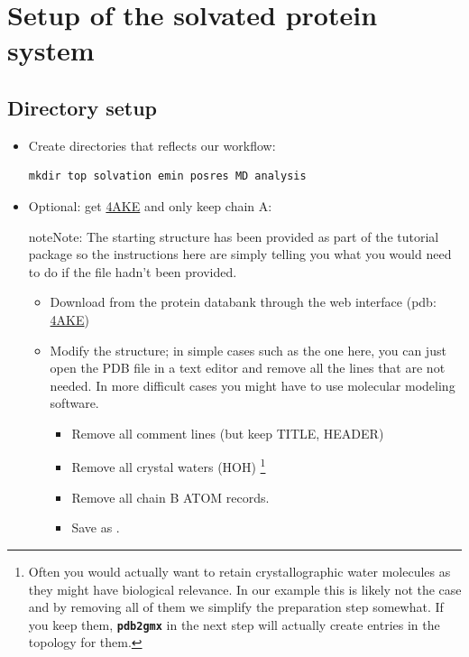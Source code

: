 \documentclass[letterpaper,10pt,english]{sphinxmanual}
\begin{document}
\chapter{Setup of the solvated protein system}
\label{system_setup:setup}\label{system_setup::doc}\label{system_setup:setup-of-the-solvated-protein-system}\label{system_setup:atom-record-of-a-pdb-file}

\section{Directory setup}
\label{system_setup:directory-setup}\begin{itemize}
\item {} 
Create directories that reflects our workflow:

\begin{Verbatim}[commandchars=\\\{\}]
mkdir top solvation emin posres MD analysis
\end{Verbatim}

\item {} 
Optional: get \href{http://www.rcsb.org/pdb/explore.do?structureId=4ake}{4AKE} and only keep chain A:

\begin{notice}{note}{Note:}
The starting structure  has been
provided as part of the tutorial package so the
instructions here are simply telling you what you would
need to do if the file hadn't been provided.
\end{notice}
\begin{itemize}
\item {} 
Download from the protein databank through the web interface (pdb:
\href{http://www.rcsb.org/pdb/explore.do?structureId=4ake}{4AKE})

\item {} 
Modify the structure; in simple cases such as the one here, you
can just open the PDB file in a text editor and remove all the
lines that are not needed. In more difficult cases you might have
to use molecular modeling software.
\begin{itemize}
\item {} 
Remove all comment lines (but keep TITLE, HEADER)

\item {} 
Remove all crystal waters (HOH) \footnote{
Often you would actually want to retain
crystallographic water molecules as they might have biological
relevance. In our example this is likely not the case and by
removing all of them we simplify the preparation step somewhat. If
you keep them, \textbf{\texttt{pdb2gmx}} in the next step will
actually create entries in the topology for them.
}

\item {} 
Remove all chain B ATOM records.

\item {} 
Save as .

\end{itemize}

\end{itemize}

\end{itemize}
\end{document}
